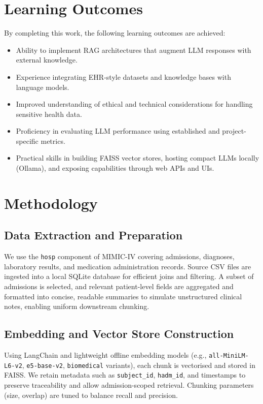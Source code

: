 \section{Learning Outcomes}
By completing this work, the following learning outcomes are achieved:
\begin{itemize}
  \item Ability to implement RAG architectures that augment LLM responses with external knowledge.
  \item Experience integrating EHR-style datasets and knowledge bases with language models.
  \item Improved understanding of ethical and technical considerations for handling sensitive health data.
  \item Proficiency in evaluating LLM performance using established and project-specific metrics.
  \item Practical skills in building FAISS vector stores, hosting compact LLMs locally (Ollama), and exposing capabilities through web APIs and UIs.
\end{itemize}

\section{Methodology}
\subsection{Data Extraction and Preparation}
We use the \texttt{hosp} component of MIMIC-IV covering admissions, diagnoses, laboratory results, and medication administration records. Source CSV files are ingested into a local SQLite database for efficient joins and filtering. A subset of admissions is selected, and relevant patient-level fields are aggregated and formatted into concise, readable summaries to simulate unstructured clinical notes, enabling uniform downstream chunking.

\subsection{Embedding and Vector Store Construction}
Using LangChain and lightweight offline embedding models (e.g., \texttt{all-MiniLM-L6-v2}, \texttt{e5-base-v2}, \texttt{biomedical} variants), each chunk is vectorised and stored in FAISS. We retain metadata such as \texttt{subject\_id}, \texttt{hadm\_id}, and timestamps to preserve traceability and allow admission-scoped retrieval. Chunking parameters (size, overlap) are tuned to balance recall and precision.


